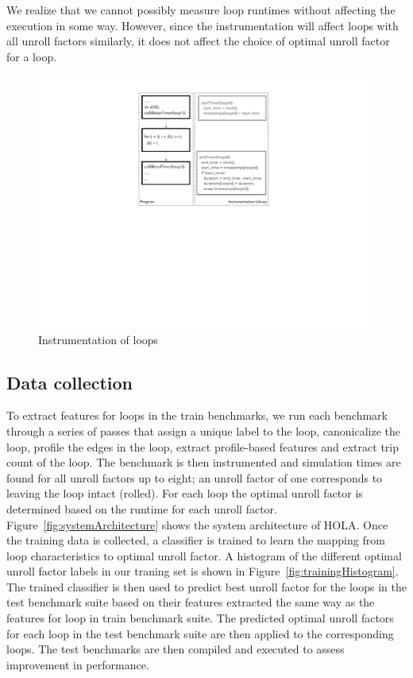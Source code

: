 \documentclass[]{sig-alternate}
\begin{document}
We realize that we cannot possibly measure loop runtimes without affecting the execution in some way. However, since the instrumentation will affect loops with all unroll factors similarly, it does not affect the choice of optimal unroll factor for a loop. 

\begin{figure}
  \center
  \includegraphics[width=0.90\linewidth]{fig/instrumentation.pdf}
  \caption{Instrumentation of loops}
  \label{fig:instrumentation}
\end{figure}

\subsection{Data collection}
\label{subsec:DataCollection}

To extract features for loops in the train benchmarks, we run each benchmark through a series of passes that assign a unique label to the loop, canonicalize the loop, profile the edges in the loop, extract profile-based features and extract trip count of the loop. The benchmark is then instrumented and simulation times are found for all unroll factors up to eight; an unroll factor of one corresponds to leaving the loop intact (rolled). For each loop the optimal unroll factor is determined based on the runtime for each unroll factor. Figure~\ref{fig:systemArchitecture} shows the system architecture of HOLA. Once the training data is collected, a classifier is trained to learn the mapping from loop characteristics to optimal unroll factor. A histogram of the different optimal unroll factor labels in our traning set is shown in Figure~\ref{fig:trainingHistogram}. The trained classifier is then used to predict best unroll factor for the loops in the test benchmark suite based on their features extracted the same way as the features for loop in train benchmark suite. The predicted optimal unroll factors for each loop in the test benchmark suite are then applied to the corresponding loops. The test benchmarks are then compiled and executed to assess improvement in performance. 
\end{document}
